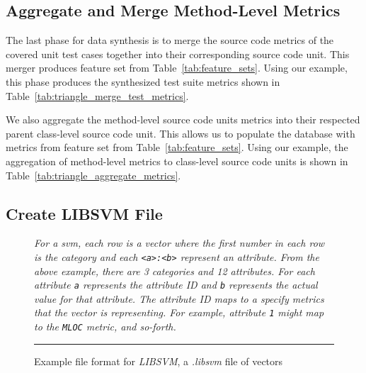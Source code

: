 \subsection{Aggregate and Merge Method-Level Metrics}
\label{subsec:approach_aggregate_merge_metrics}
The last phase for data synthesis is to merge the source code metrics of the covered unit test cases together into their corresponding source code unit. This merger produces feature set  from Table~\ref{tab:feature_sets}. Using our example, this phase produces the synthesized test suite metrics shown in Table~\ref{tab:triangle_merge_test_metrics}.

We also aggregate the method-level source code units metrics into their respected parent class-level source code unit. This allows us to populate the database with metrics from feature set  from Table~\ref{tab:feature_sets}. Using our example, the aggregation of method-level metrics to class-level source code units is shown in Table~\ref{tab:triangle_aggregate_metrics}.


\subsection{Create LIBSVM File}
\label{subsec:approach_create_libsvm_file}
\begin{figure}[!tb]
  \centering
  \begin{minipage}{9.5cm}
    
  \end{minipage}
  \caption{Example file format for \emph{LIBSVM}, a \emph{.libsvm} file of vectors}
  \vspace{1mm}
  \footnotesize{\emph{For a \gls{svm}, each row is a vector where the first number in each row is the category and each \texttt{<a>:<b>} represent an attribute. From the above example, there are 3 categories and 12 attributes. For each attribute \texttt{a} represents the attribute ID and \texttt{b} represents the actual value for that attribute. The attribute ID maps to a specify metrics that the vector is representing. For example, attribute \texttt{1} might map to the \texttt{MLOC} metric, and so-forth.}}
  \vspace{2mm}
  \hrule
  \label{fig:libsvm_file}
\end{figure}

